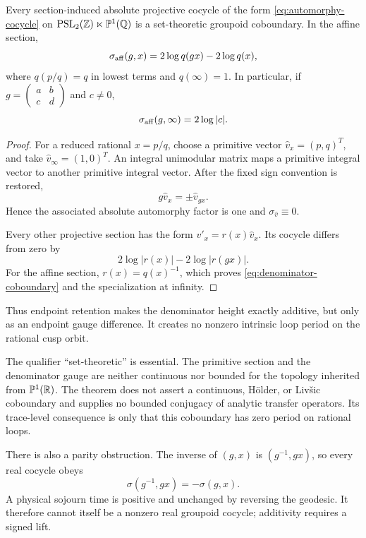 \begin{theorem}
Every section-induced absolute projective cocycle of the form
\cref{eq:automorphy-cocycle} on
\(\operatorname{PSL}_2(\mathbb{Z})\ltimes\mathbb P^1(\mathbb{Q})\) is a set-theoretic groupoid coboundary.  In the affine section,
\begin{equation}
\sigma_{\rm aff}(g,x)=2\log q(gx)-2\log q(x),
\label{eq:denominator-coboundary}
\end{equation}
where \(q(p/q)=q\) in lowest terms and \(q(\infty)=1\).  In particular, if
\(g=\left(\begin{smallmatrix}a&b\\c&d\end{smallmatrix}\right)\) and
\(c\ne0\),
\[
\sigma_{\rm aff}(g,\infty)=2\log|c|.
\]
\end{theorem}

\begin{proof}
For a reduced rational \(x=p/q\), choose a primitive vector
\(\widehat v_x=(p,q)^T\), and take
\(\widehat v_\infty=(1,0)^T\).  An integral unimodular matrix maps a
primitive integral vector to another primitive integral vector.  After the
fixed sign convention is restored,
\[
g\widehat v_x=\pm\widehat v_{gx}.
\]
Hence the associated absolute automorphy factor is one and
\(\sigma_{\widehat v}\equiv0\).

Every other projective section has the form \(v'_x=r(x)\widehat v_x\).  Its
cocycle differs from zero by
\[
2\log|r(x)|-2\log|r(gx)|.
\]
For the affine section, \(r(x)=q(x)^{-1}\), which proves
\cref{eq:denominator-coboundary} and the specialization at infinity.
\end{proof}

Thus endpoint retention makes the denominator height exactly additive, but
only as an endpoint gauge difference.  It creates no nonzero intrinsic loop
period on the rational cusp orbit.

The qualifier ``set-theoretic'' is essential.  The primitive section and the
denominator gauge are neither continuous nor bounded for the topology
inherited from \(\mathbb P^1(\mathbb{R})\).  The theorem does not assert a continuous,
H\"older, or Liv\v{s}ic coboundary and supplies no bounded conjugacy of
analytic transfer operators.  Its trace-level consequence is only that this
coboundary has zero period on rational loops.

There is also a parity obstruction.  The inverse of \((g,x)\) is
\((g^{-1},gx)\), so every real cocycle obeys
\[
\sigma(g^{-1},gx)=-\sigma(g,x).
\]
A physical sojourn time is positive and unchanged by reversing the geodesic.
It therefore cannot itself be a nonzero real groupoid cocycle; additivity
requires a signed lift.
